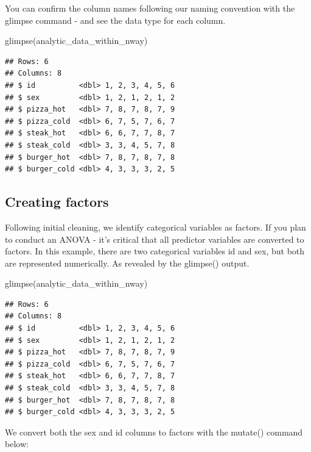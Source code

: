 \documentclass[
]{krantz}
\makeatletter
\newenvironment{Shaded}{\begin{snugshade}}{\end{snugshade}}
\newcommand{\FunctionTok}[1]{\textcolor[rgb]{0,0,0}{#1}}
\newcommand{\NormalTok}[1]{#1}
\newenvironment{kframe}{%
\medskip{}
\setlength{\fboxsep}{.8em}
 \def\at@end@of@kframe{}%
 \ifinner\ifhmode%
  \def\at@end@of@kframe{\end{minipage}}%
  \begin{minipage}{\columnwidth}%
 \fi\fi%
 \def\FrameCommand##1{\hskip\@totalleftmargin \hskip-\fboxsep
 \colorbox{shadecolor}{##1}\hskip-\fboxsep
     \hskip-\linewidth \hskip-\@totalleftmargin \hskip\columnwidth}%
 \MakeFramed {\advance\hsize-\width
   \@totalleftmargin\z@ \linewidth\hsize
   \@setminipage}}%
 {\par\unskip\endMakeFramed%
 \at@end@of@kframe}
\renewenvironment{Shaded}{\begin{kframe}}{\end{kframe}}
\makeatother
\begin{document}
You can confirm the column names following our naming convention with the glimpse command - and see the data type for each column.

\begin{Shaded}
\begin{Highlighting}[]
\FunctionTok{glimpse}\NormalTok{(analytic\_data\_within\_nway)}
\end{Highlighting}
\end{Shaded}

\begin{verbatim}
## Rows: 6
## Columns: 8
## $ id          <dbl> 1, 2, 3, 4, 5, 6
## $ sex         <dbl> 1, 2, 1, 2, 1, 2
## $ pizza_hot   <dbl> 7, 8, 7, 8, 7, 9
## $ pizza_cold  <dbl> 6, 7, 5, 7, 6, 7
## $ steak_hot   <dbl> 6, 6, 7, 7, 8, 7
## $ steak_cold  <dbl> 3, 3, 4, 5, 7, 8
## $ burger_hot  <dbl> 7, 8, 7, 8, 7, 8
## $ burger_cold <dbl> 4, 3, 3, 3, 2, 5
\end{verbatim}

\hypertarget{creating-factors-4}{%
\subsection{Creating factors}\label{creating-factors-4}}

Following initial cleaning, we identify categorical variables as factors. If you plan to conduct an ANOVA - it's critical that all predictor variables are converted to factors. In this example, there are two categorical variables id and sex, but both are represented numerically. As revealed by the glimpse() output.

\begin{Shaded}
\begin{Highlighting}[]
\FunctionTok{glimpse}\NormalTok{(analytic\_data\_within\_nway)}
\end{Highlighting}
\end{Shaded}

\begin{verbatim}
## Rows: 6
## Columns: 8
## $ id          <dbl> 1, 2, 3, 4, 5, 6
## $ sex         <dbl> 1, 2, 1, 2, 1, 2
## $ pizza_hot   <dbl> 7, 8, 7, 8, 7, 9
## $ pizza_cold  <dbl> 6, 7, 5, 7, 6, 7
## $ steak_hot   <dbl> 6, 6, 7, 7, 8, 7
## $ steak_cold  <dbl> 3, 3, 4, 5, 7, 8
## $ burger_hot  <dbl> 7, 8, 7, 8, 7, 8
## $ burger_cold <dbl> 4, 3, 3, 3, 2, 5
\end{verbatim}

We convert both the sex and id columns to factors with the mutate() command below:
\end{document}
